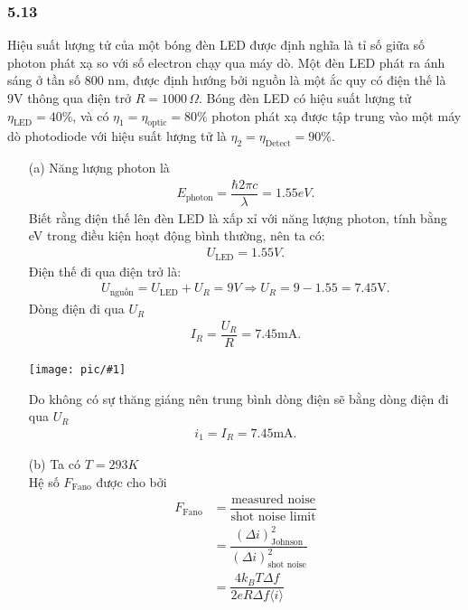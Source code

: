\documentclass{article}
\newcommand{\image}[1]{
	\begin{center}
		\texttt{[image: pic/\#1]}
	\end{center}
}
\newcommand{\f}[2]{\dfrac{#1}{#2}}
\begin{document}
\subsubsection*{5.13}
Hiệu suất lượng tử của một bóng đèn LED được định nghĩa là tỉ số giữa số photon phát xạ so với số electron chạy qua máy dò. Một đèn LED phát ra ánh sáng ở tần số 800 nm, được định hướng bởi nguồn là một ắc quy có điện thế là 9V thông qua điện trở $R = 1000 \, \Omega$. Bóng đèn LED có hiệu suất lượng tử $\eta_{\text{LED}} = 40\%$, và có $\eta_{1} = \eta_{\text{optic}} = 80\%$ photon phát xạ được tập trung vào một máy dò photodiode với hiệu suất lượng tử là $\eta_{2} =\eta_{\text{Detect}} = 90\%$.
\begin{enumerate}
	\item[(a)] Năng lượng photon là
	      \begin{align*}
		      E_{\text{photon}} = \f{\hbar 2 \pi c}{\lambda} = 1.55eV.
	      \end{align*}
	      Biết rằng điện thế lên đèn LED là xấp xỉ với năng lượng photon, tính bằng eV trong điều kiện hoạt động bình thường, nên ta có:
	      \begin{align*}
		      U_{\text{LED}} = 1.55 V.
	      \end{align*}
	      Điện thế đi qua điện trở là:
	      \begin{align*}
		      U_{\text{nguồn}} = U_{\text{LED}} + U_{R} = 9 V \Rightarrow U_{R} = 9 - 1.55 = 7.45 \text{V}.
	      \end{align*}
	      Dòng điện đi qua $U_{R}$
	      \begin{align*}
		      I_{R} = \f{U_{R}}{R} = 7.45 \text{mA}.
	      \end{align*}
	      \image{circuit.png}
	      Do không có sự thăng giáng nên trung bình dòng điện sẽ bằng dòng điện đi qua $U_{R}$
	      \begin{align*}
		      i_{1} = I_{R} = 7.45 \text{mA}.
	      \end{align*}
	\item[(b)] Ta có $T = 293 K$\\
	      Hệ số $F_{\text{Fano}}$ được cho bởi
	      \begin{align*}
		      F_{\text{Fano}}
		       & = \f{\text{measured noise}}{\text{shot noise limit}}                  \\
		       & = \f{(\Delta i)_{\text{Johnson}}^2}{(\Delta i)_{\text{shot noise}}^2} \\
		       & = \f{4 k_B T \Delta f}{2e R \Delta f \langle i \rangle}               \\

\end{align*}
\end{enumerate}
\end{document}
